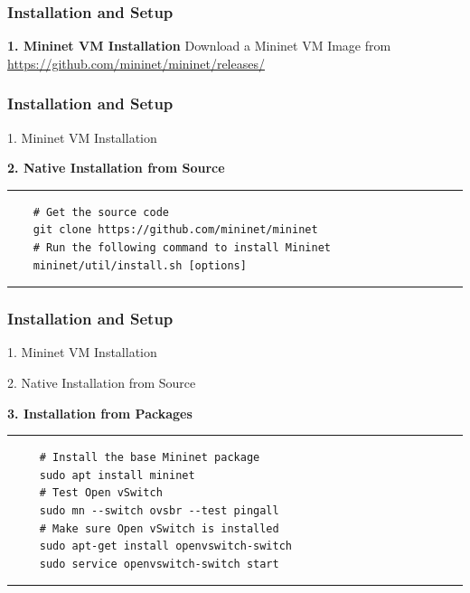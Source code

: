 \documentclass{beamer}
\begin{document}
\begin{frame}
  \frametitle{Installation and Setup}

  \begin{block}{\textbf{1. Mininet VM Installation}}
    Download a Mininet VM Image from
    \url{https://github.com/mininet/mininet/releases/}
  \end{block}

\end{frame}
\begin{frame}[fragile]
  \frametitle{Installation and Setup}

  \begin{block}{1. Mininet VM Installation}
  \end{block}
  \begin{block}{\textbf{2. Native Installation from Source}}
    \rule{\textwidth}{0.5pt}
    \small
    \begin{verbatim}
    # Get the source code
    git clone https://github.com/mininet/mininet
    # Run the following command to install Mininet
    mininet/util/install.sh [options]
  \end{verbatim}
  \rule{\textwidth}{0.5pt}
\end{block}
\end{frame}
\begin{frame}[fragile]
  \frametitle{Installation and Setup}

  \begin{block}{1. Mininet VM Installation}
  \end{block}
  \begin{block}{2. Native Installation from Source}
  \end{block}
  \begin{block}{\textbf{3. Installation from Packages}}
    \rule{\textwidth}{0.5pt}
    \small
\begin{verbatim}
     # Install the base Mininet package
     sudo apt install mininet
     # Test Open vSwitch
     sudo mn --switch ovsbr --test pingall
     # Make sure Open vSwitch is installed
     sudo apt-get install openvswitch-switch
     sudo service openvswitch-switch start
\end{verbatim}
    \rule{\textwidth}{0.5pt}
  \end{block}
\end{frame}
\end{document}
